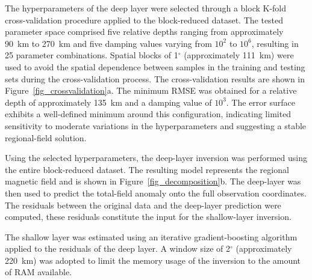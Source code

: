 \documentclass[onecolumn,10pt,a4paper]{article}
\providecommand{\DIFaddtex}[1]{{\protect\color{blue}\uwave{#1}}} %
\providecommand{\DIFaddbegin}{} %
\providecommand{\DIFaddend}{} %
\providecommand{\DIFadd}[1]{\texorpdfstring{\DIFaddtex{#1}}{#1}} %
\newcommand{\DIFaddincludegraphics}[2][]{{\color{blue}\fbox{\DIFOincludegraphics[#1]{#2}}}} %
\DeclareRobustCommand{\DIFaddbegin}{\DIFOaddbegin \let\includegraphics\DIFaddincludegraphics} %
\DeclareRobustCommand{\DIFaddend}{\DIFOaddend \let\includegraphics\DIFOincludegraphics} %
\begin{document}
The hyperparameters of the deep layer were selected through a block K-fold
cross-validation procedure applied to the block-reduced dataset. The tested
parameter space comprised five relative depths ranging from approximately
90~km to 270~km and five damping values varying from $10^{2}$ to $10^{6}$,
resulting in 25 parameter combinations. Spatial blocks of 1$^{\circ}$ 
(approximately 111~km) were used to avoid the spatial dependence between samples
in the training and testing sets during the cross-validation process.
The cross-validation results are shown in
Figure~\ref{fig_crossvalidation}a. The minimum RMSE \DIFaddbegin \DIFadd{of $83.6$ }\DIFaddend was obtained for a relative
depth of approximately 135~km and a damping value of $10^{3}$. The error
surface exhibits a well-defined minimum around this configuration,
indicating limited sensitivity to moderate variations in the
hyperparameters and suggesting a stable regional-field solution.

Using the selected hyperparameters, the deep-layer inversion was performed
using the entire block-reduced dataset. The resulting model represents the
regional magnetic field and is shown in
Figure~\ref{fig_decomposition}b. The deep-layer was then used to predict the
total-field anomaly onto the full observation coordinates.
The residuals between the original data and the deep-layer prediction were
computed, these residuals constitute the input for the shallow-layer inversion.

The shallow layer was estimated using an iterative gradient-boosting
algorithm applied to the residuals of the deep layer. A window size of
2$^{\circ}$ (approximately 220~km) was adopted to limit the memory usage of the
inversion to the amount of RAM available.
\end{document}
